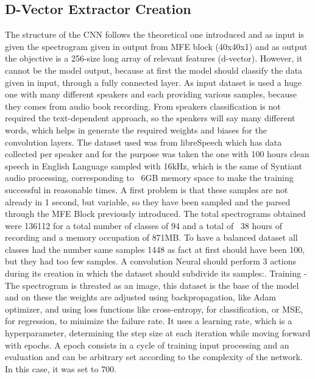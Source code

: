 \subsection{D-Vector Extractor Creation}
\label{subsec:d-vector extractor creation}
The structure of the CNN follows the theoretical one introduced and as input is given the spectrogram given in output from MFE block (40x40x1) and as output the objective is a 256-size long array of relevant features (d-vector). However, it cannot be the model output, because at first the model should classify the data given in input, through a fully connected layer. As input dataset is used a huge one with many different speakers and each providing various samples, because they comes from audio book recording. From speakers classification is not required the text-dependent approach, so the speakers will say many different words, which helps in generate the required weights and biases for the convolution layers. The dataset used was from libreSpeech which has data collected per speaker and for the purpose was taken the one with 100 hours clean speech in English Language sampled with 16kHz, which is the same of Syntiant audio processing\cite{librispeech}, corresponding to ~6GB memory space to make the training successful in reasonable times.\newline
A first problem is that these samples are not already in 1 second, but variable, so they have been sampled and the parsed through the MFE Block previously introduced. The total spectrograms obtained were 136112 for a total number of classes of 94 and a total of ~38 hours of recording and a memory occupation of 871MB. To have a balanced dataset all classes had the number same samples 1448 as fact at first should have been 100, but they had too few samples. A convolution Neural should perform 3 actions during its creation in which the dataset should subdivide its samples:\newline{}. Training - The spectrogram is threated as an image, this dataset is the base of the model and on these the weights are adjusted using backpropagation, like Adam optimizer, and using loss functions like cross-entropy, for classification, or MSE, for regression, to minimize the failure rate. It uses a learning rate, which is a hyperparameter, determining the step size at each iteration while moving forward with epochs. A epoch consists in a cycle of training input processing and an evaluation and can be arbitrary set according to the complexity of the network. In this case, it was set to 700.
